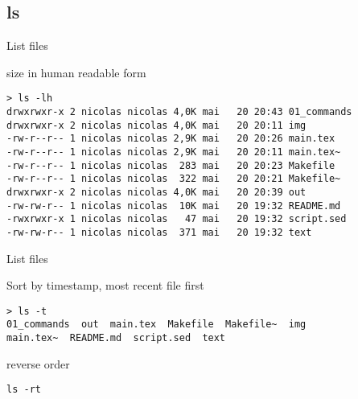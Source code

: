\subsection{ls}

\begin{frame}[fragile]{List files}
  \begin{exampleblock}{size in human readable form}
    \begin{lstlisting}[showstringspaces=false, basicstyle=\tiny]
> ls -lh
drwxrwxr-x 2 nicolas nicolas 4,0K mai   20 20:43 01_commands
drwxrwxr-x 2 nicolas nicolas 4,0K mai   20 20:11 img
-rw-r--r-- 1 nicolas nicolas 2,9K mai   20 20:26 main.tex
-rw-r--r-- 1 nicolas nicolas 2,9K mai   20 20:11 main.tex~
-rw-r--r-- 1 nicolas nicolas  283 mai   20 20:23 Makefile
-rw-r--r-- 1 nicolas nicolas  322 mai   20 20:21 Makefile~
drwxrwxr-x 2 nicolas nicolas 4,0K mai   20 20:39 out
-rw-rw-r-- 1 nicolas nicolas  10K mai   20 19:32 README.md
-rwxrwxr-x 1 nicolas nicolas   47 mai   20 19:32 script.sed
-rw-rw-r-- 1 nicolas nicolas  371 mai   20 19:32 text
    \end{lstlisting}
  \end{exampleblock}
\end{frame}


\begin{frame}[fragile]{List files}
  \begin{exampleblock}{Sort by timestamp, most recent file first}
    \begin{lstlisting}[showstringspaces=false,basicstyle=\tiny]
> ls -t
01_commands  out  main.tex  Makefile  Makefile~  img  
main.tex~  README.md  script.sed  text
    \end{lstlisting}
  \end{exampleblock}
  \pause

  \begin{exampleblock}{reverse order}
    \begin{lstlisting}[showstringspaces=false]
ls -rt
    \end{lstlisting}
  \end{exampleblock}
\end{frame}
